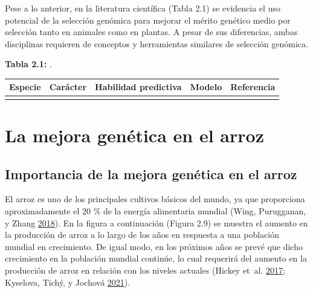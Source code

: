\documentclass[11pt,spanish,a4paper,oneside,]{book} %
\begin{document}
Pese a lo anterior, en la literatura científica (Tabla 2.1) se evidencia el uso potencial de la selección genómica para mejorar el mérito genético medio por selección tanto en animales como en plantas. A pesar de sus diferencias, ambas disciplinas requieren de conceptos y herramientas similares de selección genómica.
\hspace*{1em}

\hspace*{1em}

\noindent 
\textbf{Tabla 2.1:} .

\captionsetup[table]{labelformat=empty,skip=1pt}
\begin{longtable}{lllll}
\toprule
Especie & Carácter & Habilidad predictiva & Modelo & Referencia \\ 
\midrule
 &  &  &  &  \\ 
 \bottomrule
\end{longtable}

\hypertarget{la-mejora-genuxe9tica-en-el-arroz}{%
\section{La mejora genética en el arroz}\label{la-mejora-genuxe9tica-en-el-arroz}}

\hypertarget{importancia-de-la-mejora-genuxe9tica-en-el-arroz}{%
\subsection{Importancia de la mejora genética en el arroz}\label{importancia-de-la-mejora-genuxe9tica-en-el-arroz}}

El arroz es uno de los principales cultivos básicos del mundo, ya que proporciona aproximadamente el 20 \% de la energía alimentaria mundial (Wing, Purugganan, y Zhang \protect\hyperlink{ref-cite:55}{2018}). En la figura a continuación (Figura 2.9) se muestra el aumento en la producción de arroz a lo largo de los años en respuesta a una población mundial en crecimiento. De igual modo, en los próximos años se prevé que dicho crecimiento en la población mundial continúe, lo cual requerirá del aumento en la producción de arroz en relación con los niveles actuales (Hickey et~al. \protect\hyperlink{ref-cite:44}{2017}; Kyselova, Tichý, y Jochová \protect\hyperlink{ref-cite:32}{2021}).
\end{document}
